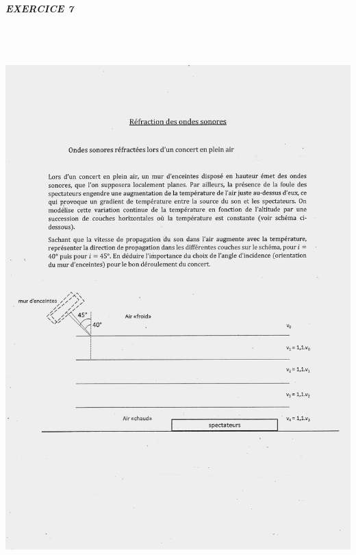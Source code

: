 \emph{\textbf{EXERCICE 7}}

\includegraphics[width=18.501cm,height=21.812cm]{Pictures/100000010000133200001AE8CBE600732ABF4D48.png}

